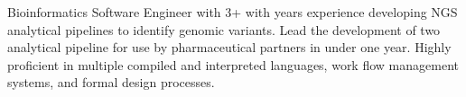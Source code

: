 

\begin{cvparagraph}

Bioinformatics Software Engineer with 3+ with years experience developing NGS analytical pipelines to identify genomic variants. Lead the development of two analytical pipeline for use by pharmaceutical partners in under one year. Highly proficient in multiple compiled and interpreted languages, work flow management systems, and formal design processes.

\end{cvparagraph}
